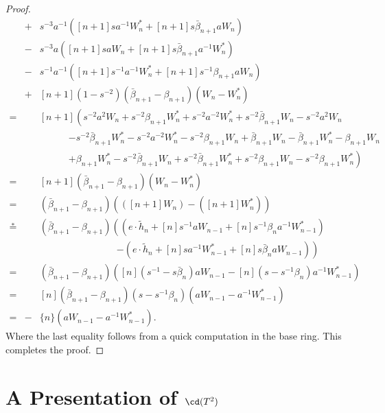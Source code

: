 \begin{proof}
\begin{eqnarray*}
&+& s^{-3}a^{-1}\left( [n+1]sa^{-1}W^*_n + [n+1]s\bar{\beta}_{n+1}aW_n \right) \\
&-&s^{-3}a\left( [n+1]saW_n + [n+1]s\bar{\beta}_{n+1}a^{-1}W^*_n \right) \\
&-& s^{-1}a^{-1}\left( [n+1]s^{-1}a^{-1}W^*_n + [n+1]s^{-1}\beta_{n+1}aW_n \right) \\
&+& [n+1]\left(1-s^{-2} \right) \left( \bar{\beta}_{n+1} - \beta_{n+1} \right) \left( W_n - W^*_n \right)\\
=&& [n+1]\left( s^{-2}a^2W_n + s^{-2}\beta_{n+1}W^*_n + s^{-2}a^{-2}W^*_n + s^{-2}\bar{\beta}_{n+1}W_n - s^{-2}a^{2}W_n \right. \\
&&\qquad\quad \left. - s^{-2}\bar{\beta}_{n+1}W^*_n - s^{-2}a^{-2}W^*_n - s^{-2}\beta_{n+1}W_n + \bar{\beta}_{n+1}W_n - \bar{\beta}_{n+1}W^*_n - \beta_{n+1}W_n \right. \\
&&\qquad\quad \left. + \beta_{n+1}W^*_n - s^{-2}\bar{\beta}_{n+1}W_n + s^{-2}\bar{\beta}_{n+1}W^*_n + s^{-2}\beta_{n+1}W_n - s^{-2}\beta_{n+1}W^*_n \right) \\
=&& [n+1]\left( \bar{\beta}_{n+1} - \beta_{n+1} \right) \left( W_n - W^*_n \right) \\
=&& \left( \bar{\beta}_{n+1} - \beta_{n+1} \right) \left( \left( [n+1]W_n \right) - \left( [n+1]W^*_n \right) \right) \\
\overset{\ast}{=}&& \left( \bar{\beta}_{n+1} - \beta_{n+1} \right) \left( \left( e \cdot \tilde{h}_{n} + [n]s^{-1}aW_{n-1} + [n]s^{-1}\beta_{n}a^{-1}W^*_{n-1} \right) \right. \\
&& \qquad\qquad\qquad\qquad \left. -\left( e \cdot \tilde{h}_{n} + [n]sa^{-1}W^*_{n-1} + [n]s\bar{\beta}_{n}aW_{n-1} \right) \right) \\
=&& \left( \bar{\beta}_{n+1} - \beta_{n+1} \right) \left( [n]\left( s^{-1} - s\bar{\beta}_{n} \right) aW_{n-1} - [n]\left( s-s^{-1}\beta_{n} \right) a^{-1}W^*_{n-1} \right) \\
=&& [n]\left(\bar{\beta}_{n+1} - \beta_{n+1} \right) \left( s - s^{-1}\beta_{n} \right) \left( aW_{n-1} - a^{-1}W^*_{n-1} \right) \\
=&-& \{n\}\left( aW_{n-1} - a^{-1}W^*_{n-1} \right).
\end{eqnarray*}
Where the last equality follows from a quick computation in the base ring. This completes the proof.
\end{proof}


\section{A Presentation of $\cd(T^2)$} \label{sec:presentation}

